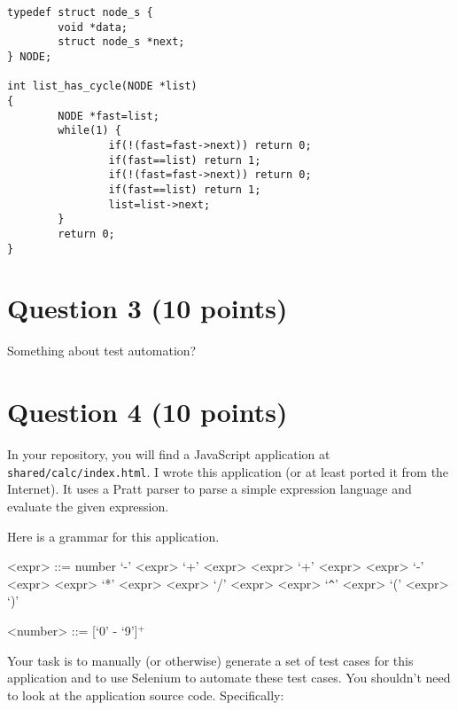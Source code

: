 \documentclass[10pt,hidelinks]{article}
\begin{document}
\begin{lstlisting}
typedef struct node_s {
        void *data;
        struct node_s *next;
} NODE;

int list_has_cycle(NODE *list)
{
        NODE *fast=list;
        while(1) {
                if(!(fast=fast->next)) return 0;
                if(fast==list) return 1;
                if(!(fast=fast->next)) return 0;
                if(fast==list) return 1;
                list=list->next;
        }
        return 0;
}
\end{lstlisting}

\section*{Question 3 (10 points)}

Something about test automation?

\section*{Question 4 (10 points)}

In your repository, you will find a JavaScript application at {\tt
  shared/calc/index.html}. I wrote this application (or at least
ported it from the Internet). It uses a Pratt parser to parse a simple expression language and evaluate the given expression.

Here is a grammar for this application.

\begin{grammar}
  <expr> ::= number 
         \alt `-' <expr>
         \alt `+' <expr>
         \alt  <expr> `+' <expr> \alt  <expr> `-' <expr>
         \alt  <expr> `*' <expr> \alt  <expr> `/' <expr>
         \alt  <expr> `\verb+^+' <expr>
         \alt `(' <expr> `)'
         
  <number> ::= [`0' - `9']$^+$
\end{grammar}


Your task is to manually (or otherwise) generate a set of test cases
for this application and to use Selenium to automate these test
cases. You shouldn't need to look at the application source
code. Specifically:
\end{document}
